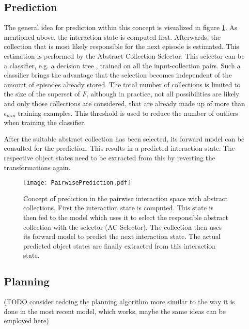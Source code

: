 \subsection{Prediction}
The general idea for prediction within this concept is visualized in figure \ref{fig:PairPrediction}. As mentioned above, the interaction state is computed first.
Afterwards, the collection that is most likely 
responsible for the next episode is estimated. This estimation is performed by the Abstract Collection Selector. This selector can be a classifier, e.g. a decision tree \cite{DT}, trained on all the input-collection pairs. Such a classifier brings the advantage that the selection becomes 
independent of the amount of episodes already stored. The total number 
of collections is limited to the size of the superset of $F$, although in 
practice, not all possibilities are likely and only those collections are 
considered, that are already made up of more than $\epsilon_{min}$ training 
examples. This threshold is used to reduce the number of outliers when training the 
classifier.  

After the suitable abstract collection has been selected, its forward model can be consulted for the prediction. This results in a predicted interaction state. The respective object states need to be extracted from this by reverting the transformations again.

\begin{figure}
	\centering
	\texttt{[image: PairwisePrediction.pdf]}
	\caption{Concept of prediction in the pairwise interaction space with abstract collections. First the interaction state is computed. This state is then fed to the model which uses it to select the responsible abstract collection with the selector (AC Selector). The collection then uses its forward model to predict the next interaction state. The actual predicted object states are finally extracted from this interaction state.} 
	\label{fig:PairPrediction}
\end{figure}

\subsection{Planning}

(TODO consider redoing the planning algorithm more similar to the way it is done
in the most recent model, which works, maybe the same ideas can be employed 
here)


